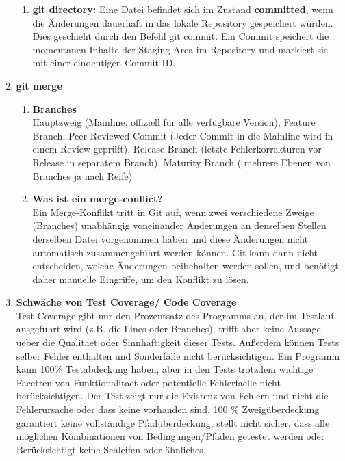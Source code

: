 \documentclass{article}
\begin{document}
\begin{enumerate}[label=\alph*)]
\begin{enumerate}[label=\arabic*)]
   \item \textbf{git directory:}
   Eine Datei befindet sich im Zustand \textbf{committed}, wenn die Änderungen dauerhaft in das lokale Repository gespeichert wurden. Dies geschieht durch den Befehl git commit. Ein Commit speichert die momentanen Inhalte der Staging Area im Repository und markiert sie mit einer eindeutigen Commit-ID.
   \end{enumerate}
   
   \item \textbf{git merge}
   \begin{enumerate}[label=\arabic*)]
   \item \textbf{Branches}\\
   Hauptzweig (Mainline, offiziell für alle verfügbare Version), Feature Branch, Peer-Reviewed Commit (Jeder Commit in die Mainline wird in einem Review geprüft), Release Branch (letzte Fehlerkorrekturen vor Release in separatem Branch), Maturity Branch ( mehrere Ebenen von Branches ja nach Reife)
   
	\item \textbf{Was ist ein merge-conflict?}\\
	Ein Merge-Konflikt tritt in Git auf, wenn zwei verschiedene Zweige (Branches) unabhängig voneinander Änderungen an denselben Stellen derselben Datei vorgenommen haben und diese Änderungen nicht automatisch zusammengeführt werden können. Git kann dann nicht entscheiden, welche Änderungen beibehalten werden sollen, und benötigt daher manuelle Eingriffe, um den Konflikt zu lösen.
   \end{enumerate}
   
   \item \textbf{Schwäche von Test Coverage/ Code Coverage}\\
   Test Coverage gibt nur den Prozentsatz des Programms an, der im
Testlauf ausgefuhrt wird (z.B. die Lines oder Branches), trifft aber keine Aussage ueber die Qualitaet oder Sinnhaftigkeit dieser Tests. Außerdem können Tests selber Fehler enthalten und Sonderfälle nicht berücksichtigen. Ein Programm kann
100\% Testabdeckung haben, aber in den Tests trotzdem wichtige Facetten von
Funktionalitaet oder potentielle Fehlerfaelle nicht berücksichtigen. Der Test zeigt nur die Existenz von Fehlern und nicht die Fehlerursache oder dass keine vorhanden sind.
100 \% Zweigüberdeckung garantiert keine vollständige Pfadüberdeckung, stellt nicht sicher, dass alle möglichen Kombinationen von Bedingungen/Pfaden getestet werden oder Berücksichtigt keine Schleifen oder ähnliches.


\end{enumerate}
\end{document}
